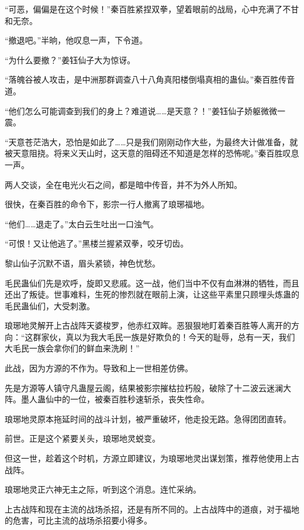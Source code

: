 
\begin{this_body}



“可恶，偏偏是在这个时候！”秦百胜紧捏双拳，望着眼前的战局，心中充满了不甘和无奈。

“撤退吧。”半晌，他叹息一声，下令道。

“为什么要撤？”姜钰仙子大为惊讶。

“落魄谷被人攻击，是中洲那群调查八十八角真阳楼倒塌真相的蛊仙。”秦百胜传音道。

“他们怎么可能调查到我们的身上？难道说……是天意？！”姜钰仙子娇躯微微一震。

“天意苍茫浩大，恐怕是如此了……只是我们刚刚动作大些，为最终大计做准备，就被天意阻挠。将来义天山时，这天意的阻碍还不知道是怎样的恐怖呢。”秦百胜叹息一声。

两人交谈，全在电光火石之间，都是暗中传音，并不为外人所知。

很快，在秦百胜的命令下，影宗一行人撤离了琅琊福地。

“他们……退走了。”太白云生吐出一口浊气。

“可恨！又让他逃了。”黑楼兰握紧双拳，咬牙切齿。

黎山仙子沉默不语，眉头紧锁，神色忧愁。

毛民蛊仙们先是欢呼，旋即又悲戚。这一战，他们当中不仅有血淋淋的牺牲，而且还出了叛徒。世事难料，生死的惨烈就在眼前上演，让这些平素里只顾埋头炼蛊的毛民蛊仙们，大受刺激。

琅琊地灵解开上古战阵天婆梭罗，他赤红双眸。恶狠狠地盯着秦百胜等人离开的方向：“这群家伙，真以为我大毛民一族是好欺负的！今天的耻辱，总有一天，我们大毛民一族会拿你们的鲜血来洗刷！”

此战，因为方源的不作为。导致和上一世相差仿佛。

先是方源等人镇守凡蛊屋云阁，结果被影宗摧枯拉朽般，破除了十二波云迷澜大阵。墨人蛊仙中的一位，被秦百胜秒速斩杀，丧失性命。

琅琊地灵原本拖延时间的战斗计划，被严重破坏，他走投无路。急得团团直转。

前世。正是这个紧要关头，琅琊地灵蜕变。

但这一世，趁着这个时机，方源立即建议，为琅琊地灵出谋划策，推荐他使用上古战阵。

琅琊地灵正六神无主之际，听到这个消息。连忙采纳。

上古战阵和现在主流的战场杀招，还是有所不同的。上古战阵中的道痕，对于福地的危害，可比主流的战场杀招要小得多。


\end{this_body}
